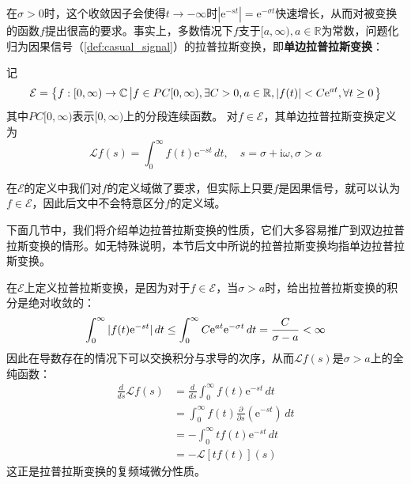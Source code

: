 在$\sigma>0$时，这个收敛因子会使得$t\to -\infty$时$\left|\mathrm{e}^{-st}\right|=\mathrm{e}^{-\sigma t}$快速增长，从而对被变换的函数$f$提出很高的要求。事实上，多数情况下$f$支于$[a,\infty),a\in\mathbb{R}$为常数，问题化归为因果信号（\cref{def:casual_signal}）的拉普拉斯变换，即\textbf{单边拉普拉斯变换}\cite{folland}：
\begin{definition}[单边拉普拉斯变换]
    \label{def:single_laplace}
    记\[\mathcal{E}=\left\{f:[0,\infty)\to\mathbb{C}\left|f\in PC[0,\infty),\exists C>0,a\in\mathbb{R},|f(t)|<C\mathrm{e}^{at},\forall t\geq 0\right.\right\}\]
    其中$PC[0,\infty)$表示$[0,\infty)$上的分段连续函数。
    对$f\in\mathcal{E}$，其单边拉普拉斯变换定义为
    \[\mathcal{L} f(s)=\int_{0}^{\infty}f(t)\mathrm{e}^{-st}\,dt,\quad s=\sigma+\mathrm{i}\omega,\sigma>a\]
\end{definition}
在$\mathcal{E} $的定义中我们对$f$的定义域做了要求，但实际上只要$f$是因果信号，就可以认为$f\in\mathcal{E}$，因此后文中不会特意区分$f$的定义域。

下面几节中，我们将介绍单边拉普拉斯变换的性质，它们大多容易推广到双边拉普拉斯变换的情形。如无特殊说明，本节后文中所说的拉普拉斯变换均指单边拉普拉斯变换。

在$\mathcal{E} $上定义拉普拉斯变换，是因为对于$f\in\mathcal{E} $，当$\sigma>a$时，给出拉普拉斯变换的积分是绝对收敛的：
\begin{align*}
    \int_0^{\infty}|f(t)\mathrm{e}^{-st}|\,dt\leq \int_0^{\infty}C\mathrm{e}^{at}\mathrm{e}^{-\sigma t}\,dt=\frac{C}{\sigma-a}<\infty
\end{align*}
因此在导数存在的情况下可以交换积分与求导的次序，从而$\mathcal{L} f(s)$是$\sigma>a$上的全纯函数：
\begin{align*}
    \frac{d}{ds}\mathcal{L} f(s)&=\frac{d}{ds}\int_0^{\infty}f(t)\mathrm{e}^{-st}\,dt\\
    &=\int_0^{\infty}f(t)\frac{\partial}{\partial s}(\mathrm{e}^{-st})\,dt\\
    &=-\int_0^{\infty}tf(t)\mathrm{e}^{-st}\,dt\\
    &=-\mathcal{L} [tf(t)](s)
\end{align*}
这正是拉普拉斯变换的复频域微分性质。


